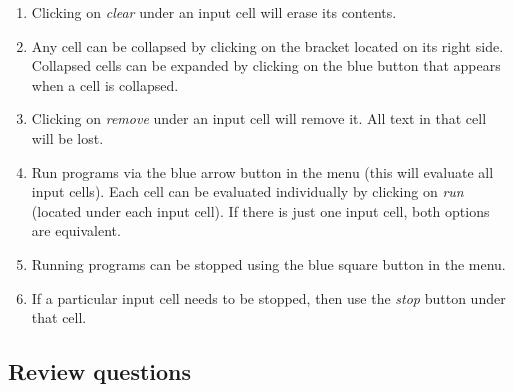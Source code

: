 {{{{\begin{enumerate}
\item Clicking on {\em clear} under an input cell will erase its contents.
\item Any cell can be collapsed by clicking on the bracket located on its right side. Collapsed
      cells can be expanded by clicking on the blue button that appears when a cell is 
      collapsed.
\item Clicking on {\em remove} under an input cell will remove it. All text in that cell will be lost.
\item Run programs via the blue arrow button in the menu (this will evaluate all input
      cells). Each cell can be evaluated individually by clicking on {\em run} (located under 
      each input cell). If there is just one input cell, both options are equivalent.
\item Running programs can be stopped using the blue square button in the menu. 
\item If a particular
      input cell needs to be stopped, then use the {\em stop} button under that cell.
\end{enumerate}

\subsection{Review questions}

}}}}
